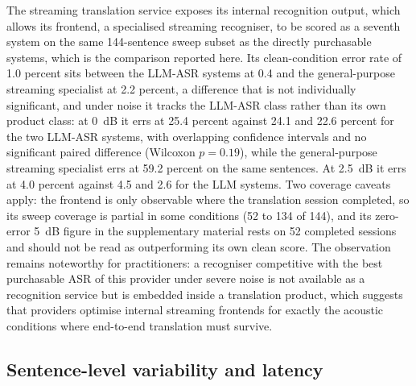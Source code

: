 The streaming translation service exposes its internal recognition output,
which allows its frontend, a specialised streaming recogniser, to be scored
as a seventh system on the same 144-sentence sweep subset as the directly
purchasable systems, which is the comparison reported here. Its
clean-condition error rate of 1.0 percent sits between the LLM-ASR systems
at 0.4 and the general-purpose streaming specialist at 2.2 percent, a
difference that is not individually significant, and
under noise it tracks the LLM-ASR class rather than its own product class:
at 0~dB it errs at 25.4 percent against 24.1 and 22.6 percent for the two
LLM-ASR systems, with overlapping confidence intervals and no significant
paired difference (Wilcoxon $p=0.19$), while the general-purpose streaming
specialist errs at 59.2 percent on the same sentences. At 2.5~dB it errs at
4.0 percent against 4.5 and 2.6 for the LLM systems. Two coverage caveats
apply: the frontend is only observable where the translation session
completed, so its sweep coverage is partial in some conditions (52 to 134 of
144), and its zero-error 5~dB figure in the supplementary material rests on 52 completed
sessions and should not be read as outperforming its own clean score. The
observation remains noteworthy for practitioners: a recogniser competitive
with the best purchasable ASR of this provider under severe noise is not
available as a recognition service but is embedded inside a translation
product, which suggests that providers optimise internal streaming
frontends for exactly the acoustic conditions where end-to-end translation
must survive.

\subsection{Sentence-level variability and latency}
\label{sec:results:latency}


